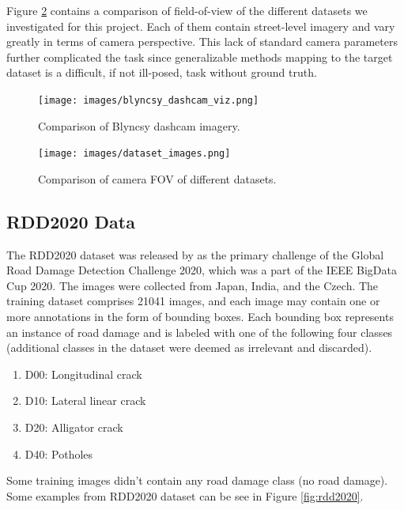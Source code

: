 \documentclass{article}
\begin{document}
Figure \ref{fig:datasets_comparison_viz} contains a comparison of field-of-view of the different datasets we investigated for this project. Each of them contain street-level imagery and vary greatly in terms of camera perspective. This lack of standard camera parameters further complicated the task since generalizable methods mapping to the target dataset is a difficult, if not ill-posed, task without ground truth.

\begin{figure}[ht]
\begin{center}
\texttt{[image: images/blyncsy\_dashcam\_viz.png]}
\end{center}
\caption{Comparison of Blyncsy dashcam imagery.}
\label{fig:blyncsy_dashcam_viz}
\end{figure}


\begin{figure}[ht]
\begin{center}
\texttt{[image: images/dataset\_images.png]}
\end{center}
\caption{Comparison of camera FOV of different datasets.}
\label{fig:datasets_comparison_viz}
\end{figure}

\subsection{RDD2020 Data}
The RDD2020 dataset was released by \cite{RDD2020} as the primary challenge of the Global Road Damage Detection Challenge 2020, which was a part of the IEEE BigData Cup 2020. The images were collected from Japan, India, and the Czech. The training dataset comprises 21041 images, and each image may contain one or more annotations in the form of bounding boxes. Each bounding box represents an instance of road damage and is labeled with one of the following four classes (additional classes in the dataset were deemed as irrelevant and discarded).
\begin{enumerate}
    \item D00: Longitudinal crack
    \item D10: Lateral linear crack
    \item D20: Alligator crack
    \item D40: Potholes
\end{enumerate}

Some training images didn't contain any road damage class (no road damage). Some examples from RDD2020 dataset can be see in Figure \ref{fig:rdd2020}.
\end{document}
